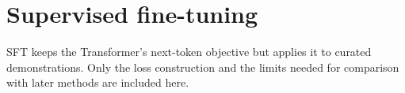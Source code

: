 \section{Supervised fine-tuning}

SFT keeps the Transformer's next-token objective but applies it to curated demonstrations.
Only the loss construction and the limits needed for comparison with later methods are
included here.



